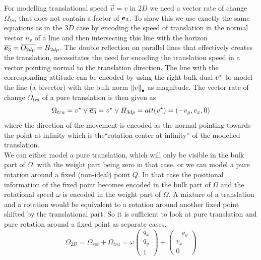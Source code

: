 For modelling translational speed $\vec{v} = v$ in $2D$ we need a vector rate of change
$\Omega_{tra}$ that does not contain a factor of $\bm{e}_{3}$. To show this we use exactly the
same equations as in the $3D$ case by encoding the speed of translation in the normal
vector $n_v$ of a line and then intersecting this line with the horizon $\overline{\bm{e}_{3}} =
\overline{O_{2dp}} = H_{2dp}$. The double reflection on parallel lines that effectively
creates the translation, necessitates the need for encoding the translation speed in a
vector pointing normal to the translation direction. The line with the corresponding
attitude can be encoded by using the right bulk dual ${v}^\star$ to model the line
(a bivector) with the bulk norm ${\left \lVert {v} \right \rVert}_\bullet$ as magnitude. The vector rate of change
$\Omega_{tra}$ of a pure translation is then given as
\begin{equation}
   \Omega_{tra} = {v}^\star \vee \overline{\bm{e}_{3}} = {v}^\star \vee H_{3dp}
                = att({v}^\star)
                = (-v_y, v_x, 0)
   \label{eq:vector_trans_rate_v_vec}
\end{equation}
where the direction of the movement is encoded as the normal pointing towards the point at
infinity which is the``rotation center at infinity'' of the modelled translation. \\

We can either model a pure translation, which will only be visible in the bulk part of
$\Omega$, with the weight part being zero in that case, or we can model a pure rotation
around a fixed (non-ideal) point $Q$. In that case the positional information of the fixed
point becomes encoded in the bulk part of $\Omega$ and the rotational speed $\omega$ is
encoded in the weight part of $\Omega$. A mixture of a translation and a rotation would be
equivalent to a rotation around another fixed point shifted by the translational part. So
it is sufficient to look at pure translation and pure rotation around a fixed point as
separate cases.
\begin{equation}
   \Omega_{2D} = \Omega_{rot} + \Omega_{tra} =
   \omega
   \begin{pmatrix}
      q_x \\
      q_y \\
      1
   \end{pmatrix}
   +
   \begin{pmatrix}
      -v_y \\
      v_x \\
      0
   \end{pmatrix}
\end{equation}

